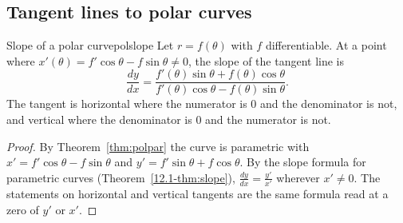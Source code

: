\documentclass[11pt]{article}
\begin{document}
\begin{center}
\end{center}

\subsection*{Tangent lines to polar curves}

\begin{thm}{Slope of a polar curve}{polslope}
Let $r=f(\theta)$ with $f$ differentiable. At a point where $x'(\theta)=f'\cos\theta-f\sin\theta\ne0$, the slope of the tangent line is
\[
\frac{dy}{dx}=\frac{f'(\theta)\sin\theta+f(\theta)\cos\theta}{f'(\theta)\cos\theta-f(\theta)\sin\theta}.
\]
The tangent is horizontal where the numerator is $0$ and the denominator is not, and vertical where the denominator is $0$ and the numerator is not.
\end{thm}
\begin{proof}
By Theorem~\ref{thm:polpar} the curve is parametric with $x'=f'\cos\theta-f\sin\theta$ and $y'=f'\sin\theta+f\cos\theta$. By the slope formula for parametric curves (Theorem~\ref{12.1-thm:slope}), $\frac{dy}{dx}=\frac{y'}{x'}$ wherever $x'\ne0$. The statements on horizontal and vertical tangents are the same formula read at a zero of $y'$ or $x'$.
\end{proof}
\end{document}

